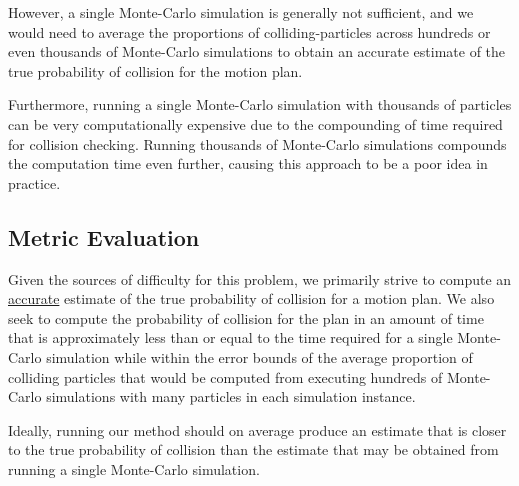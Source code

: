 \documentclass[journal]{IEEEtran}
\begin{document}
However, a single Monte-Carlo simulation is generally not sufficient, and we would need to average the proportions of colliding-particles across hundreds or even thousands of Monte-Carlo simulations to obtain an accurate estimate of the true probability of collision for the motion plan.

Furthermore, running a single Monte-Carlo simulation with thousands of particles can be very computationally expensive due to the compounding of time required for collision checking. Running thousands of Monte-Carlo simulations compounds the computation time even further, causing this approach to be a poor idea in practice.%


\subsection{Metric Evaluation}
Given the sources of difficulty for this problem, we primarily strive to compute an \underline{accurate} estimate of the true probability of collision for a motion plan. We also seek to compute the probability of collision for the plan in an amount of time that is approximately less than or equal to the time required for a single Monte-Carlo simulation while within the error bounds of the average proportion of colliding particles that would be computed from executing hundreds of Monte-Carlo simulations with many particles in each simulation instance.

Ideally, running our method should on average produce an estimate that is closer to the true probability of collision than the estimate that may be obtained from running a single Monte-Carlo simulation.
\end{document}

